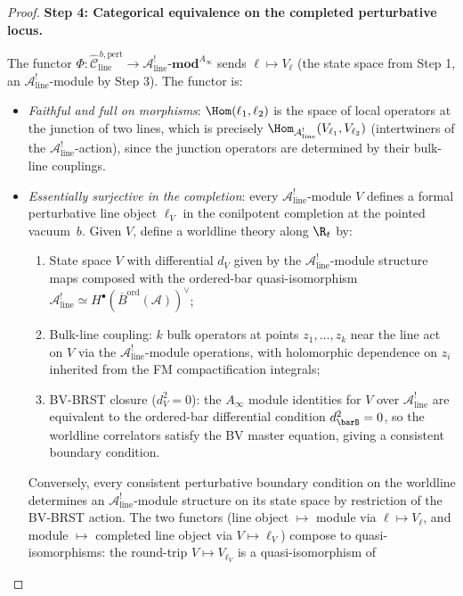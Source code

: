 \begin{proof}
\textbf{Step 4: Categorical equivalence on the completed perturbative
locus.}

The functor
$\Phi: \widehat{\mathcal{C}}^{\,b,\mathrm{pert}}_{\mathrm{line}}
\to \mathcal{A}^!_{\mathrm{line}}\text{-}\mathbf{mod}^{A_\infty}$
sends $\ell \mapsto V_\ell$ (the state space from Step 1, an
$\mathcal{A}^!_{\mathrm{line}}$-module by Step 3). The functor is:
\begin{itemize}
\item \emph{Faithful and full on morphisms}: $\Hom(\ell_1, \ell_2)$ is the space of local operators at the junction of two lines, which is precisely $\Hom_{\mathcal{A}^!_{\mathrm{line}}}(V_{\ell_1}, V_{\ell_2})$ (intertwiners of the $\mathcal{A}^!_{\mathrm{line}}$-action), since the junction operators are determined by their bulk-line couplings.
\item \emph{Essentially surjective in the completion}: every
$\mathcal{A}^!_{\mathrm{line}}$-module $V$ defines a formal
perturbative line object $\ell_V$ in the conilpotent completion at
the pointed vacuum~$b$. Given $V$, define a worldline theory along
$\R_t$ by:
 \begin{enumerate}[label=\textup{(\alph*)}]
 \item State space $V$ with differential $d_V$ given by the $\mathcal{A}^!_{\mathrm{line}}$-module structure maps composed with the ordered-bar quasi-isomorphism $\mathcal{A}^!_{\mathrm{line}} \simeq H^\bullet(\overline{B}^{\mathrm{ord}}(\mathcal{A}))^\vee$;
 \item Bulk-line coupling: $k$ bulk operators at points $z_1, \ldots, z_k$ near the line act on $V$ via the $\mathcal{A}^!_{\mathrm{line}}$-module operations, with holomorphic dependence on $z_i$ inherited from the FM compactification integrals;
 \item BV-BRST closure ($d_V^2 = 0$): the $A_\infty$ module identities for $V$ over $\mathcal{A}^!_{\mathrm{line}}$ are equivalent to the ordered-bar differential condition $d_{\barB}^2 = 0$, so the worldline correlators satisfy the BV master equation, giving a consistent boundary condition.
 \end{enumerate}
 Conversely, every consistent perturbative boundary condition on the
worldline determines an $\mathcal{A}^!_{\mathrm{line}}$-module
structure on its state space by restriction of the BV-BRST action.
The two functors (line object $\mapsto$ module via
$\ell \mapsto V_\ell$, and module $\mapsto$ completed line object via
$V \mapsto \ell_V$) compose to quasi-isomorphisms: the round-trip
$V \mapsto V_{\ell_V}$ is a quasi-isomorphism of

\end{itemize}
\end{proof}
